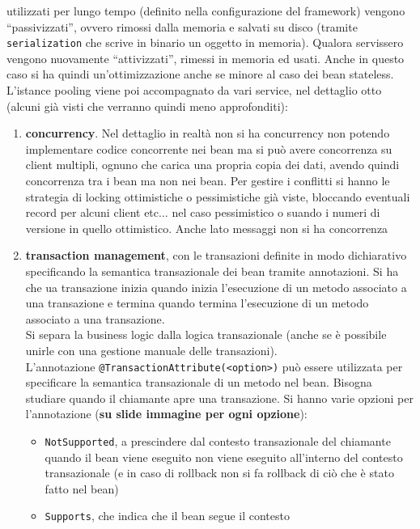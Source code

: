 \documentclass[a4paper,12pt, oneside]{book}
\begin{document}
utilizzati per lungo tempo (definito nella configurazione del framework)
vengono ``passivizzati'', ovvero rimossi dalla memoria e salvati su disco
(tramite \texttt{serialization} che scrive in binario un oggetto in
memoria). Qualora servissero vengono nuovamente ``attivizzati'', rimessi in
memoria ed usati. Anche in questo caso si ha quindi un'ottimizzazione anche se
minore al caso dei bean stateless.\\
L'istance pooling viene poi accompagnato da vari service, nel dettaglio otto
(alcuni già visti che verranno quindi meno approfonditi):
\begin{enumerate}
  \item \textbf{concurrency}. Nel dettaglio in realtà non si ha concurrency non
  potendo implementare codice concorrente nei bean ma si può avere concorrenza
  su client multipli, ognuno che carica una propria copia dei dati, avendo
  quindi concorrenza tra i bean ma non nei bean. Per gestire i conflitti si
  hanno le strategia di locking ottimistiche o pessimistiche già viste,
  bloccando eventuali record per alcuni client etc$\ldots$ nel caso pessimistico
  o suando i numeri di versione in quello ottimistico. Anche lato messaggi non
  si ha concorrenza
  \item \textbf{transaction management}, con le transazioni definite in modo
  dichiarativo specificando la semantica transazionale dei bean tramite
  annotazioni. Si ha che ua transazione inizia quando inizia l'esecuzione di un
  metodo associato a una transazione e termina quando termina
  l'esecuzione di un metodo associato a una transazione.\\
  Si separa la business logic dalla logica transazionale (anche se è possibile
  unirle con una gestione manuale delle transazioni).\\
  L'annotazione \texttt{@TransactionAttribute(<option>)} può essere utilizzata
  per 
  specificare la semantica transazionale di un metodo nel bean. Bisogna studiare
  quando il chiamante apre una transazione. Si hanno varie
  opzioni per l'annotazione (\textbf{su slide immagine per ogni opzione}):
  \begin{itemize}
    \item \texttt{NotSupported}, a prescindere dal contesto transazionale del
    chiamante quando il bean viene eseguito non viene eseguito all'interno del
    contesto transazionale (e in caso di rollback non si fa rollback di ciò che
    è stato fatto nel bean)
    \item \texttt{Supports}, che indica che il bean segue il contesto

\end{itemize}
\end{enumerate}
\end{document}
